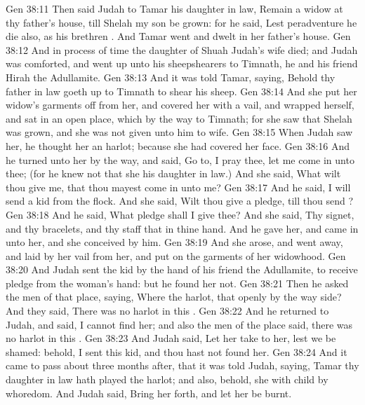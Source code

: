 \vs Gen 38:11 Then said Judah to Tamar his daughter in law, Remain a widow at thy father's house, till Shelah my son be grown: for he said, Lest peradventure he die also, as his brethren . And Tamar went and dwelt in her father's house.
\vs Gen 38:12 And in process of time the daughter of Shuah Judah's wife died; and Judah was comforted, and went up unto his sheepshearers to Timnath, he and his friend Hirah the Adullamite.
\vs Gen 38:13 And it was told Tamar, saying, Behold thy father in law goeth up to Timnath to shear his sheep.
\vs Gen 38:14 And she put her widow's garments off from her, and covered her with a vail, and wrapped herself, and sat in an open place, which  by the way to Timnath; for she saw that Shelah was grown, and she was not given unto him to wife.
\vs Gen 38:15 When Judah saw her, he thought her  an harlot; because she had covered her face.
\vs Gen 38:16 And he turned unto her by the way, and said, Go to, I pray thee, let me come in unto thee; (for he knew not that she  his daughter in law.) And she said, What wilt thou give me, that thou mayest come in unto me?
\vs Gen 38:17 And he said, I will send  a kid from the flock. And she said, Wilt thou give  a pledge, till thou send ?
\vs Gen 38:18 And he said, What pledge shall I give thee? And she said, Thy signet, and thy bracelets, and thy staff that  in thine hand. And he gave  her, and came in unto her, and she conceived by him.
\vs Gen 38:19 And she arose, and went away, and laid by her vail from her, and put on the garments of her widowhood.
\vs Gen 38:20 And Judah sent the kid by the hand of his friend the Adullamite, to receive  pledge from the woman's hand: but he found her not.
\vs Gen 38:21 Then he asked the men of that place, saying, Where  the harlot, that  openly by the way side? And they said, There was no harlot in this .
\vs Gen 38:22 And he returned to Judah, and said, I cannot find her; and also the men of the place said,  there was no harlot in this .
\vs Gen 38:23 And Judah said, Let her take  to her, lest we be shamed: behold, I sent this kid, and thou hast not found her.
\vs Gen 38:24 And it came to pass about three months after, that it was told Judah, saying, Tamar thy daughter in law hath played the harlot; and also, behold, she  with child by whoredom. And Judah said, Bring her forth, and let her be burnt.
